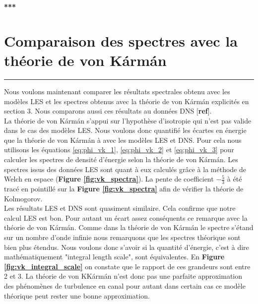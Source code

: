 \documentclass[12pt]{article}
\theoremstyle{plain}
\theoremstyle{remark}
\begin{document}
\begin{center}
	\large \bf{***}
\end{center}




\vspace{0.3cm}
\section{Comparaison des spectres avec la théorie de von Kármán}
\noindent\rule{\linewidth}{2pt}
\vspace{0.1cm}

Nous voulons maintenant comparer les résultats spectrales obtenu avec les modèles LES et les spectres obtenus avec la théorie de von Kármán explicités en section 3. Nous comparons aussi ces résultats au données DNS [{\bf ref}]. \\
La théorie de von Kármán s'appui sur l'hypothèse d'isotropie qui n'est pas valide dans le cas des modèles LES. Nous voulons donc quantifié les écartes en énergie que la théorie de von Kármán à avec les modèles LES et DNS. Pour cela nous utilisons les équations \ref{eq:phi_vk_1}, \ref{eq:phi_vk_2} et \ref{eq:phi_vk_3} pour calculer les spectres de densité d'énergie selon la théorie de von Kármán. Les spectres issus des données LES sont quant à eux calculés grâce à la méthode de Welch en espace ({\bf Figure \ref{fig:vk_spectra}}). La pente de coefficient $-\frac{5}{3}$ à été tracé en pointillé sur la {\bf Figure \ref{fig:vk_spectra}} afin de vérifier la théorie de Kolmogorov. \\

Les résultats LES et DNS sont quasiment similaire. Cela confirme que notre calcul LES est bon. Pour autant un écart assez conséquents ce remarque avec la théorie de von Kármán. Comme dans la théorie de von Kármán le spectre s'étand sur un nombre d'onde infinie nous remarquons que les spectres théorique sont bien plus étendus. Nous voulons donc s'avoir si la quantité d'énergie, c'est à dire mathématiquement "integral length scale", sont équivalentes. En {\bf Figure \ref{fig:vk_integral_scale}} on constate que le rapport de ces grandeurs sont entre 2 et 3. La théorie de von KKármán n'est donc pas une parfaite approximation des phénomènes de turbulence en canal pour autant dans certain cas ce modèle théorique peut rester une bonne approximation. 
	
\end{document}
